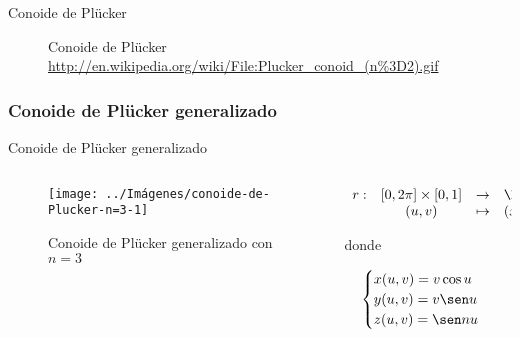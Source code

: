\documentclass[10pt]{beamer}
\begin{document}
	\begin{frame}{Conoide de Plücker}
	\begin{figure}
		\centering
		\caption{Conoide de Plücker \url{http://en.wikipedia.org/wiki/File:Plucker_conoid_(n\%3D2).gif}}
		\label{fig:conoide-de-Plücker-gif}
	\end{figure}
	\end{frame}
	
	\subsubsection{Conoide de Plücker generalizado}
	
	\begin{frame}{Conoide de Plücker generalizado}
		\begin{columns}[t] %
			\begin{column}{.50\textwidth}
				\begin{figure}
					\centering
					\texttt{[image: ../Imágenes/conoide-de-Plucker-n=3-1]}
					\caption{Conoide de Plücker generalizado con $n=3$}
					\label{fig:conoide-de-Plucker-generalizado-1}
				\end{figure}
			\end{column}%
			\hfill%
			\begin{column}{.50\textwidth}
				$$\begin{array}{rcll}
				r : & [0, 2\pi] \times [0,1] & \to & \R^3\\
				& (u,v) & \mapsto & (x,y,z)
				\end{array}$$
				
				donde 
				
				$$ \begin{cases}
				x(u,v) = v \cos u \\
				y(u,v) = v \sen u \\
				z(u,v) = \sen nu
				\end{cases} $$
			\end{column}%
		\end{columns}
	\end{frame}
	
\end{document}

